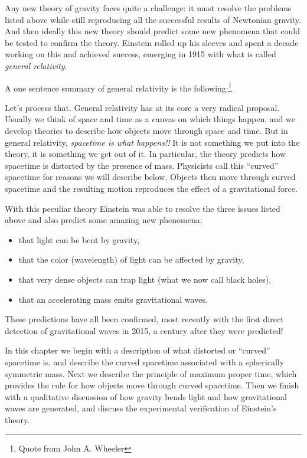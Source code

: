 Any new theory of gravity faces quite a challenge: it must resolve the
problems listed above while still reproducing all the successful
results of Newtonian gravity.  And then ideally this new theory should
predict some new phenomena that could be tested to confirm the theory.
Einstein rolled up his sleeves and spent a decade working on this and
achieved success, emerging in 1915 with what is called \textit{general
  relativity}.

A one sentence summary of general relativity is the
following:\footnote{Quote from John A. Wheeler}



Let's process that.  General relativity has at its core a very
radical proposal.  Usually we think of space and time as a canvas on
which things happen, and we develop theories to describe how objects
move through space and time.  But in general relativity,
\textit{spacetime is what happens!!}  It is not something we put into
the theory, it is something we get out of it.  In particular, the
theory predicts how spacetime is distorted by the presence of mass.
Physicists call this ``curved'' spacetime for reasons we will describe
below.  Objects then move through curved spacetime and the resulting
motion reproduces the effect of a gravitational force.

With this peculiar theory Einstein was able to resolve the three
issues listed above and also predict some amazing new phenomena:
\begin{itemize}
\item that light can be bent by gravity,
\item that the color (wavelength) of light can be affected by
  gravity,
\item that very dense objects can trap light (what we now call black
  holes),
\item that an accelerating mass emits gravitational waves.
\end{itemize}
These predictions have all been
confirmed, most recently with the first direct
detection of gravitational waves in 2015, a century after they were 
predicted!

In this chapter we begin with a description of what distorted or
``curved'' spacetime is, and describe the curved spacetime associated
with a spherically symmetric mass.  Next we describe the principle of
maximum proper time, which provides the rule for how objects move
through curved spacetime.  Then we finish with a qualitative
discussion of how gravity bends light and how gravitational waves are
generated, and discuss the experimental verification of Einstein's
theory.


